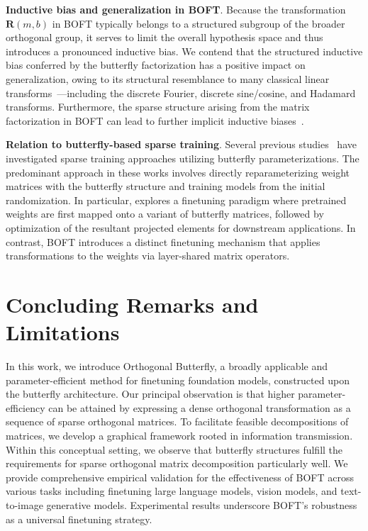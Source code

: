 \textbf{Inductive bias and generalization in BOFT}. Because the transformation $\bm{R}(m,b)$ in BOFT typically belongs to a structured subgroup of the broader orthogonal group, it serves to limit the overall hypothesis space and thus introduces a pronounced inductive bias. We contend that the structured inductive bias conferred by the butterfly factorization has a positive impact on generalization, owing to its structural resemblance to many classical linear transforms~\cite{dao2019kaleidoscope}—including the discrete Fourier, discrete sine/cosine, and Hadamard transforms. Furthermore, the sparse structure arising from the matrix factorization in BOFT can lead to further implicit inductive biases~\cite{gunasekar2017implicit,li2018algorithmic,liu2019neural}.

\textbf{Relation to butterfly-based sparse training}. Several previous studies~\cite{dao2019learning,dao2019kaleidoscope,chen2022pixelated,dao2022monarch} have investigated sparse training approaches utilizing butterfly parameterizations. The predominant approach in these works involves directly reparameterizing weight matrices with the butterfly structure and training models from the initial randomization. In particular, \cite{dao2022monarch} explores a finetuning paradigm where pretrained weights are first mapped onto a variant of butterfly matrices, followed by optimization of the resultant projected elements for downstream applications. In contrast, BOFT introduces a distinct finetuning mechanism that applies transformations to the weights via layer-shared matrix operators.



\section{Concluding Remarks and Limitations}

In this work, we introduce Orthogonal Butterfly, a broadly applicable and parameter-efficient method for finetuning foundation models, constructed upon the butterfly architecture. Our principal observation is that higher parameter-efficiency can be attained by expressing a dense orthogonal transformation as a sequence of sparse orthogonal matrices. To facilitate feasible decompositions of matrices, we develop a graphical framework rooted in information transmission. Within this conceptual setting, we observe that butterfly structures fulfill the requirements for sparse orthogonal matrix decomposition particularly well. We provide comprehensive empirical validation for the effectiveness of BOFT across various tasks including finetuning large language models, vision models, and text-to-image generative models. Experimental results underscore BOFT's robustness as a universal finetuning strategy.

